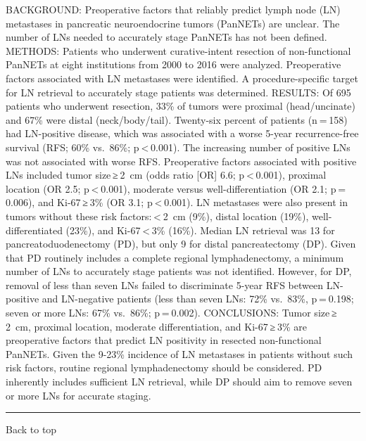 \documentclass[]{article}
\begin{document}
BACKGROUND: Preoperative factors that reliably predict lymph node (LN)
metastases in pancreatic neuroendocrine tumors (PanNETs) are unclear.
The number of LNs needed to accurately stage PanNETs has not been
defined. METHODS: Patients who underwent curative-intent resection of
non-functional PanNETs at eight institutions from 2000 to 2016 were
analyzed. Preoperative factors associated with LN metastases were
identified. A procedure-specific target for LN retrieval to accurately
stage patients was determined. RESULTS: Of 695 patients who underwent
resection, 33\% of tumors were proximal (head/uncinate) and 67\% were
distal (neck/body/tail). Twenty-six percent of patients (n = 158) had
LN-positive disease, which was associated with a worse 5-year
recurrence-free survival (RFS; 60\% vs.~86\%; p \textless{} 0.001). The
increasing number of positive LNs was not associated with worse RFS.
Preoperative factors associated with positive LNs included tumor
size ≥ 2~cm (odds ratio {[}OR{]} 6.6; p \textless{} 0.001), proximal
location (OR 2.5; p \textless{} 0.001), moderate versus
well-differentiation (OR 2.1; p = 0.006), and Ki-67 ≥ 3\% (OR 3.1;
p \textless{} 0.001). LN metastases were also present in tumors without
these risk factors: \textless{} 2~cm (9\%), distal location (19\%),
well-differentiated (23\%), and Ki-67 \textless{} 3\% (16\%). Median LN
retrieval was 13 for pancreatoduodenectomy (PD), but only 9 for distal
pancreatectomy (DP). Given that PD routinely includes a complete
regional lymphadenectomy, a minimum number of LNs to accurately stage
patients was not identified. However, for DP, removal of less than seven
LNs failed to discriminate 5-year RFS between LN-positive and
LN-negative patients (less than seven LNs: 72\% vs.~83\%, p = 0.198;
seven or more LNs: 67\% vs.~86\%; p = 0.002). CONCLUSIONS: Tumor
size ≥ 2~cm, proximal location, moderate differentiation, and
Ki-67 ≥ 3\% are preoperative factors that predict LN positivity in
resected non-functional PanNETs. Given the 9-23\% incidence of LN
metastases in patients without such risk factors, routine regional
lymphadenectomy should be considered. PD inherently includes sufficient
LN retrieval, while DP should aim to remove seven or more LNs for
accurate staging.

{}

{}

\begin{center}\rule{0.5\linewidth}{\linethickness}\end{center}

Back to top
\end{document}
